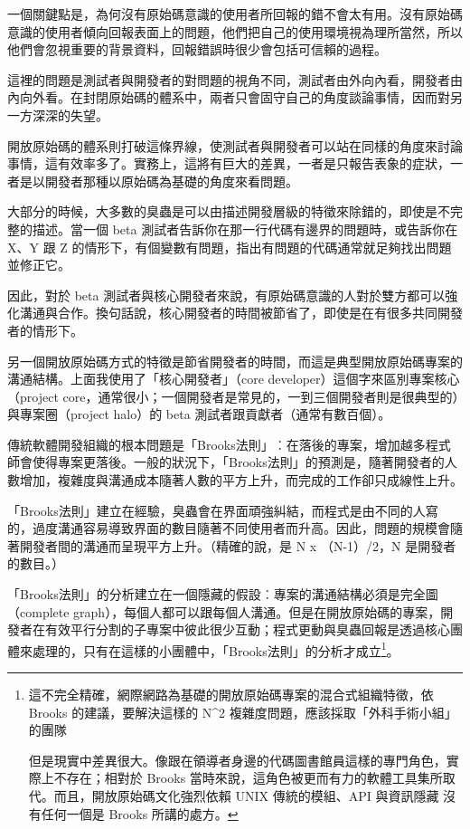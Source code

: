 \documentclass[12pt,]{article}
\makeatletter
\newcommand*{\shifttext}[2]{%
  \settowidth{\@tempdima}{#2}%
  \makebox[\@tempdima]{\hspace*{#1}#2}%
}
\makeatother
\begin{document}
一個關鍵點是，為何沒有原始碼意識的使用者所回報的錯不會太有用。沒有原始碼意識的使用者傾向回報表面上的問題，他們把自己的使用環境視為理所當然，所以他們會忽視重要的背景資料，回報錯誤時很少會包括可信賴的過程。

這裡的問題是測試者與開發者的對問題的視角不同，測試者由外向內看，開發者由內向外看。在封閉原始碼的體系中，兩者只會固守自己的角度談論事情，因而對另一方深深的失望。

開放原始碼的體系則打破這條界線，使測試者與開發者可以站在同樣的角度來討論事情，這有效率多了。實務上，這將有巨大的差異，一者是只報告表象的症狀，一者是以開發者那種以原始碼為基礎的角度來看問題。

大部分的時候，大多數的臭蟲是可以由描述開發層級的特徵來除錯的，即使是不完整的描述。當一個
beta 測試者告訴你在那一行代碼有邊界的問題時，或告訴你在 X、Y 跟 Z
的情形下，有個變數有問題，指出有問題的代碼通常就足夠找出問題並修正它。

因此，對於 beta
測試者與核心開發者來說，有原始碼意識的人對於雙方都可以強化溝通與合作。換句話說，核心開發者的時間被節省了，即使是在有很多共同開發者的情形下。

另一個開放原始碼方式的特徵是節省開發者的時間，而這是典型開放原始碼專案的溝通結構。上面我使用了「核心開發者」（core
developer）這個字來區別專案核心（project
core，通常很小；一個開發者是常見的，一到三個開發者則是很典型的）與專案圈（project
halo）的 beta 測試者跟貢獻者（通常有數百個）。

傳統軟體開發組織的根本問題是「Brooks法則」︰在落後的專案，增加越多程式師會使得專案更落後。一般的狀況下，「Brooks法則」的預測是，隨著開發者的人數增加，複雜度與溝通成本隨著人數的平方上升，而完成的工作卻只成線性上升。

「Brooks法則」建立在經驗，臭蟲會在界面頑強糾結，而程式是由不同的人寫的，過度溝通容易導致界面的數目隨著不同使用者而升高。因此，問題的規模會隨著開發者間的溝通而呈現平方上升。（精確的說，是
N x （N-1）/2，N 是開發者的數目。）

「Brooks法則」的分析建立在一個隱藏的假設︰專案的溝通結構必須是完全圖（complete
graph），每個人都可以跟每個人溝通。但是在開放原始碼的專案，開發者在有效平行分割的子專案中彼此很少互動；程式更動與臭蟲回報是透過核心團體來處理的，只有在這樣的小團體中，「Brooks法則」的分析才成立\footnote{這不完全精確，網際網路為基礎的開放原始碼專案的混合式組織特徵，依
  Brooks 的建議，要解決這樣的 N\^{}2
  複雜度問題，應該採取「外科手術小組」的團隊 \shifttext{1pt}{---}\shifttext{-1pt}{---}
  但是現實中差異很大。像跟在領導者身邊的代碼圖書館員這樣的專門角色，實際上不存在；相對於
  Brooks
  當時來說，這角色被更而有力的軟體工具集所取代。而且，開放原始碼文化強烈依賴
  UNIX 傳統的模組、API 與資訊隱藏 \shifttext{1pt}{---}\shifttext{-1pt}{---} 沒有任何一個是 Brooks
  所講的處方。}。
\end{document}
